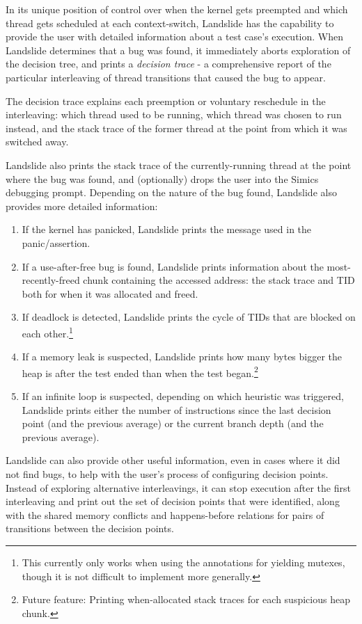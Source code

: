 
In its unique position of control over when the kernel gets preempted and which thread gets scheduled at each context-switch, Landslide has the capability to provide the user with detailed information about a test case's execution.
When Landslide determines that a bug was found, it immediately aborts exploration of the decision tree, and prints a {\em decision trace} - a comprehensive report of the particular interleaving of thread transitions that caused the bug to appear.

The decision trace explains each preemption or voluntary reschedule in the interleaving: which thread used to be running, which thread was chosen to run instead, and the stack trace of the former thread at the point from which it was switched away.

Landslide also prints the stack trace of the currently-running thread at the point where the bug was found, and (optionally) drops the user into the Simics debugging prompt. Depending on the nature of the bug found, Landslide also provides more detailed information:

\begin{enumerate}
	\item If the kernel has panicked, Landslide prints the message used in the panic/assertion.
	\item If a use-after-free bug is found, Landslide prints information about the most-recently-freed chunk containing the accessed address: the stack trace and TID both for when it was allocated and freed.
	\item If deadlock is detected, Landslide prints the cycle of TIDs that are blocked on each other.\footnote{This currently only works when using the annotations for yielding mutexes, though it is not difficult to implement more generally.}
	\item If a memory leak is suspected, Landslide prints how many bytes bigger the heap is after the test ended than when the test began.\footnote{Future feature: Printing when-allocated stack traces for each suspicious heap chunk.}
	\item If an infinite loop is suspected, depending on which heuristic was triggered, Landslide prints either the number of instructions since the last decision point (and the previous average) or the current branch depth (and the previous average).
\end{enumerate}

Landslide can also provide other useful information, even in cases where it did not find bugs, to help with the user's process of configuring decision points. Instead of exploring alternative interleavings, it can stop execution after the first interleaving and print out the set of decision points that were identified, along with the shared memory conflicts and happens-before relations for pairs of transitions between the decision points.
